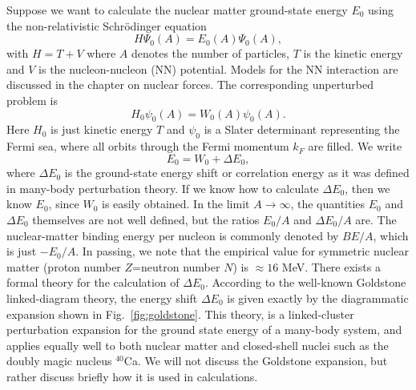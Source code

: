 \documentclass[%
oneside,                 %
final,                   %
10pt]{article}
\begin{document}
Suppose we want to calculate the nuclear matter ground-state
energy $E_0$ using the non-relativistic Schr\"{o}dinger equation
\begin{equation}
      H\Psi_0(A)=E_0(A)\Psi_0(A),
\end{equation}
with $H=T+V$ where $A$ denotes the number of particles, $T$
is the kinetic energy and $V$ is
the nucleon-nucleon
(NN)  potential. Models for the NN interaction are discussed in the chapter on nuclear forces.
The corresponding unperturbed
problem is
\begin{equation}
      H_0\psi_0(A)=W_0(A)\psi_0(A).
\end{equation}
Here $H_0$ is just kinetic energy $T$ and $\psi_0$ is a Slater
determinant representing the Fermi sea, where all orbits through the
Fermi momentum $k_F$ are filled. We write
\begin{equation}
      E_0=W_0+\Delta E_0,
\end{equation}
where $\Delta E_0$ is the ground-state energy shift or correlation energy as it was defined in many-body perturbation theory.
If we know how to calculate $\Delta E_0$, then we know $E_0$, since
$W_0$ is easily obtained. In the limit $A\rightarrow \infty$,
the quantities $E_0$ and $\Delta E_0$ themselves are not well
defined, but the ratios $E_0/A$ and $\Delta E_0/A$ are. The
nuclear-matter binding energy per nucleon is commonly denoted
by $BE/A$, which is just $-E_0/A$. In passing, we note that
the empirical value for symmetric nuclear matter (proton number
$Z$=neutron number $N$) is $\approx 16$ MeV.
There exists a formal theory for the calculation of $\Delta E_0$.
According to the well-known Goldstone linked-diagram theory, the energy shift $\Delta E_0$ is given exactly by the
diagrammatic expansion shown in Fig.~\ref{fig:goldstone}. This theory,
is a linked-cluster perturbation expansion for the ground state
energy of a many-body system, and applies equally well to both
nuclear matter and closed-shell nuclei such as the doubly magic
nucleus $^{40}$Ca. 
We will not discuss the Goldstone expansion, but rather discuss
briefly how it is used in calculations.
\end{document}
